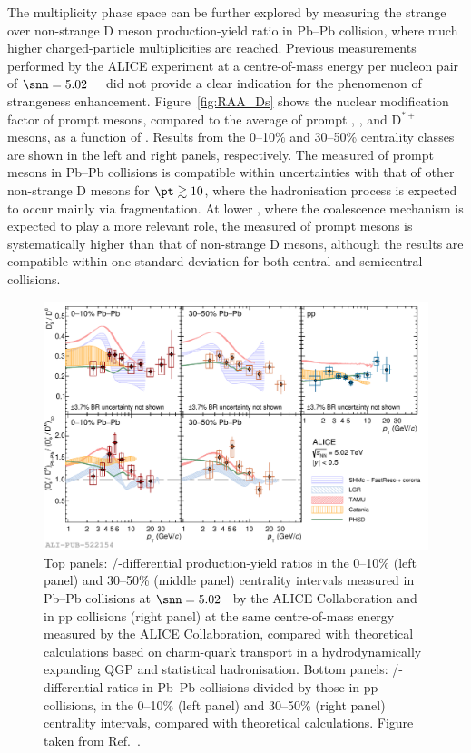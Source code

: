 \begin{sloppypar}
The multiplicity phase space can be further explored by measuring the strange over non-strange D meson production-yield ratio in Pb--Pb collision, where much higher charged-particle multiplicities are reached. Previous measurements performed by the ALICE experiment at a centre-of-mass energy per nucleon pair of \mbox{$\snn=5.02$~\tev~\cite{ALICE:2021kfc}} did not provide a clear indication for the phenomenon of strangeness enhancement. Figure~\ref{fig:RAA_Ds} shows the nuclear modification factor \raa of prompt \ds mesons, compared to the average \raa of prompt \dz, \dpl, and $\mathrm{D^{*+}}$ mesons, as a function of \pt. Results from the 0--10\% and 30--50\% centrality classes are shown in the left and right panels, respectively. The measured \raa of prompt \ds mesons in Pb--Pb collisions is compatible within uncertainties with that of other non-strange D mesons for $\pt\gtrsim10$\gevc, where the hadronisation process is expected to occur mainly via fragmentation. At lower \pt, where the coalescence mechanism is expected to play a more relevant role, the measured \raa of prompt \ds mesons is systematically higher than that of non-strange D mesons, although the results are compatible within one standard deviation for both central and semicentral collisions.
\end{sloppypar}

\begin{figure}[htb]
    \centering
    \includegraphics[width=\textwidth]{Figures/Chapter 9/Ratio_and_DoubleRatio_DsOverD0_PbPb_pp_5TeV_vs_models_1.pdf}
    \caption{Top panels: \ds/\dz \pt-differential production-yield ratios in the 0--10\% (left panel) and 30--50\% (middle panel) centrality intervals measured in Pb--Pb collisions at \mbox{$\snn=5.02$~\tev} by the ALICE Collaboration and in pp collisions (right panel) at the same centre-of-mass energy measured by the ALICE Collaboration, compared with theoretical calculations based on charm-quark transport in a hydrodynamically expanding QGP and statistical hadronisation. Bottom panels: \ds/\dz \pt-differential ratios in Pb--Pb collisions divided by those in pp collisions, in the 0--10\% (left panel) and 30--50\% (right panel) centrality intervals, compared with theoretical calculations. Figure taken from Ref.~\cite{ALICE:2021npz}.}
    \label{fig:Double_ratio}
\end{figure}

